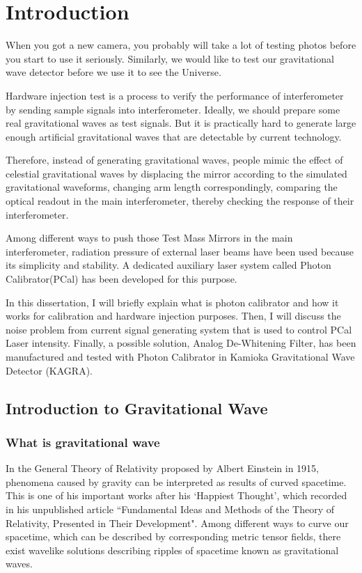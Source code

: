 \chapter{Introduction} 

When you got a new camera, you probably will take a lot of testing photos before you start to use it seriously. Similarly, we would like to test our gravitational wave detector before we use it to see the Universe.

Hardware injection test is a process to verify the performance of interferometer by sending sample signals into interferometer\cite{ligo:inj}. Ideally, we should prepare some real gravitational waves as test signals. But it is practically hard to generate large enough artificial gravitational waves that are detectable by current technology. 

Therefore, instead of generating gravitational waves, people mimic the effect of celestial gravitational waves by displacing the mirror according to the simulated gravitational waveforms, changing arm length correspondingly, comparing the optical readout in the main interferometer, thereby checking the response of their interferometer. 

Among different ways to push those Test Mass Mirrors in the main interferometer, radiation pressure of external laser beams have been used because its simplicity and stability. A dedicated auxiliary laser system called Photon Calibrator(PCal) has been developed for this purpose. 

In this dissertation, I will briefly explain what is photon calibrator and how it works for calibration and hardware injection purposes. Then, I will discuss the noise problem from current signal generating system that is used to control PCal Laser intensity. Finally, a possible solution, Analog De-Whitening Filter, has been manufactured and tested with Photon Calibrator in Kamioka Gravitational Wave Detector (KAGRA). 
 

\section{Introduction to Gravitational Wave}
\subsection{What is gravitational wave}

In the General Theory of Relativity proposed by Albert Einstein in 1915, phenomena caused by gravity can be interpreted as results of curved spacetime. This is one of his important works after his `Happiest Thought', which recorded in his unpublished article ``Fundamental Ideas and Methods of the Theory of Relativity, Presented in Their Development"\cite{Einstein:happy}. Among different ways to curve our spacetime, which can be described by corresponding metric tensor fields, there exist wavelike solutions describing ripples of spacetime known as gravitational waves.

